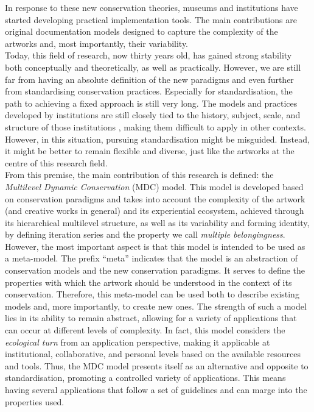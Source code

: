 In response to these new conservation theories, museums and institutions have started developing practical implementation tools. The main contributions are original documentation models designed to capture the complexity of the artworks and, most importantly, their variability.\\
Today, this field of research, now thirty years old, has gained strong stability both conceptually and theoretically, as well as practically. However, we are still far from having an absolute definition of the new paradigms and even further from standardising conservation practices. Especially for standardisation, the path to achieving a fixed approach is still very long. The models and practices developed by institutions are still closely tied to the history, subject, scale, and structure of those institutions \cite{wielocha2024collections}, making them difficult to apply in other contexts. However, in this situation, pursuing standardisation might be misguided. Instead, it might be better to remain flexible and diverse, just like the artworks at the centre of this research field.\\
From this premise, the main contribution of this research is defined: the \textit{Multilevel Dynamic Conservation} (MDC) model. This model is developed based on conservation paradigms and takes into account the complexity of the artwork (and creative works in general) and its experiential ecosystem, achieved through its hierarchical multilevel structure, as well as its variability and forming identity, by defining iteration series and the property we call \textit{multiple belongingness}. However, the most important aspect is that this model is intended to be used as a meta-model. The prefix ``meta'' indicates that the model is an abstraction of conservation models and the new conservation paradigms. It serves to define the properties with which the artwork should be understood in the context of its conservation. Therefore, this meta-model can be used both to describe existing models and, more importantly, to create new ones. The strength of such a model lies in its ability to remain abstract, allowing for a variety of applications that can occur at different levels of complexity. In fact, this model considers the \textit{ecological turn} from an application perspective, making it applicable at institutional, collaborative, and personal levels based on the available resources and tools. Thus, the MDC model presents itself as an alternative and opposite to standardisation, promoting a controlled variety of applications. This means having several applications that follow a set of guidelines and can marge into the properties used.

